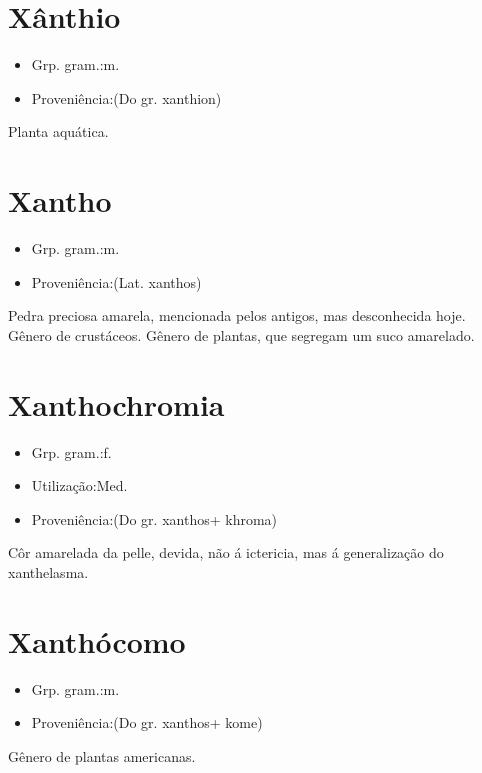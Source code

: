 \section{Xânthio}
\begin{itemize}
\item {Grp. gram.:m.}
\end{itemize}
\begin{itemize}
\item {Proveniência:(Do gr. \textunderscore xanthion\textunderscore )}
\end{itemize}
Planta aquática.
\section{Xantho}
\begin{itemize}
\item {Grp. gram.:m.}
\end{itemize}
\begin{itemize}
\item {Proveniência:(Lat. \textunderscore xanthos\textunderscore )}
\end{itemize}
Pedra preciosa amarela, mencionada pelos antigos, mas desconhecida hoje.
Gênero de crustáceos.
Gênero de plantas, que segregam um suco amarelado.
\section{Xanthochromia}
\begin{itemize}
\item {Grp. gram.:f.}
\end{itemize}
\begin{itemize}
\item {Utilização:Med.}
\end{itemize}
\begin{itemize}
\item {Proveniência:(Do gr. \textunderscore xanthos\textunderscore  + \textunderscore khroma\textunderscore )}
\end{itemize}
Côr amarelada da pelle, devida, não á ictericia, mas á generalização do xanthelasma.
\section{Xanthócomo}
\begin{itemize}
\item {Grp. gram.:m.}
\end{itemize}
\begin{itemize}
\item {Proveniência:(Do gr. \textunderscore xanthos\textunderscore  + \textunderscore kome\textunderscore )}
\end{itemize}
Gênero de plantas americanas.
